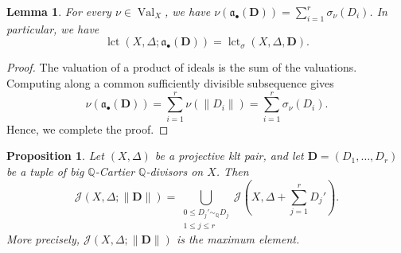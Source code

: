 \documentclass[a4paper,12pt]{amsart}
\newtheorem{lemma}[theorem]{Lemma}
\newtheorem{proposition}[theorem]{Proposition}
\theoremstyle{plain}
\theoremstyle{definition}
\numberwithin{equation}{section}
\DeclareMathOperator{\Val}{Val}
\def\lct{\operatorname{lct}}
\begin{document}
\begin{lemma}\label{lem-eq}
    For every \(\nu\in \Val_X\), we have $\nu(\mathfrak{a}_{\bullet}(\mathbf{D}))=\sum_{i=1}^r \sigma_{\nu}(D_i)$. In particular, we have
    \[
    \lct(X,\Delta;\mathfrak{a}_{\bullet}(\mathbf{D}))=\lct_{\sigma}(X,\Delta,\mathbf{D}).
    \]
\end{lemma}
\begin{proof}
    The valuation of a product of ideals is the sum of the valuations. Computing along a common sufficiently divisible subsequence gives
    \[
    \nu(\mathfrak{a}_{\bullet}(\mathbf{D}))=\sum_{i=1}^r \nu(\|D_i\|)=\sum_{i=1}^r \sigma_{\nu}(D_i).
    \]
    Hence, we complete the proof.
\end{proof}

\begin{proposition}\label{prop:sum}
Let $(X,\Delta)$ be a projective klt pair, and let $\mathbf D=(D_1,\ldots,D_r)$ be a tuple of big $\mathbb Q$-Cartier $\mathbb Q$-divisors on $X$. Then
\[
\mathcal J(X,\Delta;\|\mathbf D\|)=\bigcup_{\substack{0\leq D_j'\sim_{\mathbb Q}D_j\\1\leq j\leq r}}
\mathcal J\left(X,\Delta+\sum_{j=1}^rD_j'\right).
\]
More precisely, $\mathcal J(X,\Delta;\|\mathbf D\|)$ is the maximum element.
\end{proposition}
\end{document}
